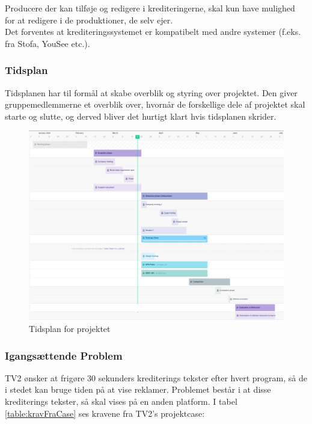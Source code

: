 \noindent
Producere der kan tilføje og redigere i krediteringerne, skal kun have mulighed for at redigere i de produktioner, de selv ejer.\\
Det forventes at krediteringssystemet er kompatibelt med andre systemer (f.eks. fra Stofa, YouSee etc.).

\subsubsection{Tidsplan}
Tidsplanen har til formål at skabe overblik og styring over projektet. 
Den giver gruppemedlemmerne et overblik over, hvornår de forskellige dele af projektet skal starte og slutte, og derved bliver det hurtigt klart hvis tidsplanen skrider. \\

\begin{landscape}
    \begin{figure}
        \centering
        \includegraphics[scale=0.30]{figures/grantt_udvidet.png}
        \caption{Tidsplan for projektet}
        \label{fig:gantt}
    \end{figure}{}
\end{landscape}


\subsubsection{Igangsættende Problem}
TV2 ønsker at frigøre 30 sekunders krediterings tekster efter hvert program, så de i stedet kan bruge tiden på at vise reklamer. Problemet består i at disse krediterings tekster, så skal vises på en anden platform. I tabel \ref{table:kravFraCase} ses kravene fra TV2's projektcase: \\

